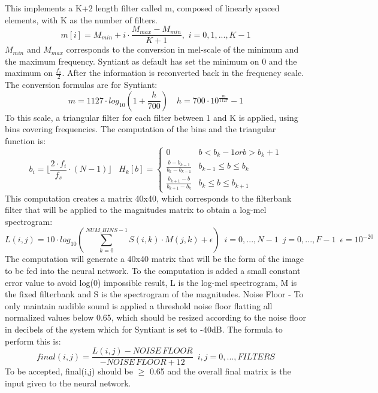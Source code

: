 This implements a K+2 length filter called m, composed of linearly spaced elements, with K as the number of filters.
\begin{equation}
    m[i]=M_{min}+i\cdot\frac{M_{max}-M_{min}}{K+1},\,\,i=0,1,...,K-1
\end{equation}
$M_{min}$ and $M_{max}$ corresponds to the conversion in mel-scale of the minimum and the maximum frequency. Syntiant as default has set the minimum on 0 and the maximum on $\frac{f_s}{2}$. After the information is reconverted back in the frequency scale. The conversion formulas are for Syntiant:
\begin{equation}
    m=1127\cdot log_{10}(1+\frac{h}{700})\,\,\,\,\,\,h=700\cdot 10^{\frac{m}{1127}}-1
\end{equation}
To this scale, a triangular filter for each filter between 1 and K is applied, using bins covering frequencies. The computation of the bins and the triangular function is:
\begin{equation}
    b_i=\lfloor \frac{2\cdot f_i}{f_s}\cdot(N-1)\rfloor\,\,\,\,\,H_k[b]=
    \begin{cases}
        0 & b<b_k-1 or b>b_k+1\\
        \frac{b-b_{k-1}}{b_k-b_{k-1}} & b_{k-1}\leq b \leq b_k\\
        \frac{b_{k+1}-b}{b_{k+1}-b_k} & b_k \leq b \leq b_{k+1}
    \end{cases}
\end{equation}
This computation creates a matrix 40x40, which corresponds to the filterbank filter that will be applied to the magnitudes matrix to obtain a log-mel spectrogram:
\begin{equation}
    L(i,j)=10\cdot log_{10}(\sum_{k=0}^{NUM\_BINS-1}S(i,k)\cdot M(j,k)+\epsilon)\,\,\,i=0,...,N-1\,\,\,j=0,...,F-1\,\,\,\epsilon=10^{-20}
\end{equation}
The computation will generate a 40x40 matrix that will be the form of the image to be fed into the neural network. To the computation is added a small constant error value to avoid log(0) impossible result, L is the log-mel spectrogram, M is the fixed filterbank and S is the spectrogram of the magnitudes. Noise Floor - To only maintain audible sound is applied a threshold noise floor flatting all normalized values below 0.65, which should be resized according to the noise floor in decibels of the system which for Syntiant is set to -40dB. The formula to perform this is:
\begin{equation}
    final(i,j)=\frac{L(i,j)-NOISE\,FLOOR}{-NOISE\,FLOOR+12}\,\,\,i,j=0,...,FILTERS
\end{equation}
To be accepted, final(i,j) should be $\geq$ 0.65 and the overall final matrix is the input given to the neural network.
